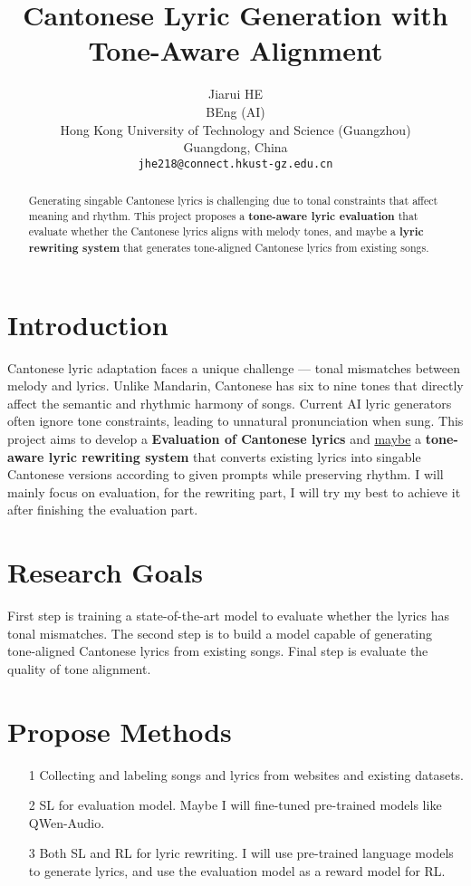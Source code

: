 \documentclass{article}
\title{Cantonese Lyric Generation with Tone-Aware Alignment}
\author{%
    Jiarui HE \\
    BEng (AI) \\
    Hong Kong University of Technology and Science (Guangzhou) \\
    Guangdong, China \\
    \texttt{jhe218@connect.hkust-gz.edu.cn} \\
}
\begin{document}
\maketitle

\begin{abstract}
Generating singable Cantonese lyrics is challenging due to tonal constraints that affect meaning and rhythm. This project proposes a \textbf{tone-aware lyric evaluation} that evaluate whether the Cantonese lyrics aligns with melody tones, and maybe a \textbf{lyric rewriting system} that generates tone-aligned Cantonese lyrics from existing songs.
\end{abstract}

\section{Introduction}
Cantonese lyric adaptation faces a unique challenge --- tonal mismatches between melody and lyrics. Unlike Mandarin, Cantonese has six to nine tones that directly affect the semantic and rhythmic harmony of songs. Current AI lyric generators often ignore tone constraints, leading to unnatural pronunciation when sung. This project aims to develop a \textbf{Evaluation of Cantonese lyrics} and \underline{maybe} a \textbf{tone-aware lyric rewriting system} that converts existing lyrics into singable Cantonese versions according to given prompts while preserving rhythm. I will mainly focus on evaluation, for the rewriting part, I will try my best to achieve it after finishing the evaluation part.

\section{Research Goals}
First step is training a state-of-the-art model to evaluate whether the lyrics has tonal mismatches. The second step is to build a model capable of generating tone-aligned Cantonese lyrics from existing songs. Final step is evaluate the quality of tone alignment.

\section{Propose Methods}
\begin{itemize}
    \item[1] Collecting and labeling songs and lyrics from websites and existing datasets.
    \item[2] SL for evaluation model. Maybe I will fine-tuned pre-trained models like QWen-Audio.
    \item[3] Both SL and RL for lyric rewriting. I will use pre-trained language models to generate lyrics, and use the evaluation model as a reward model for RL.
\end{itemize}
\end{document}
